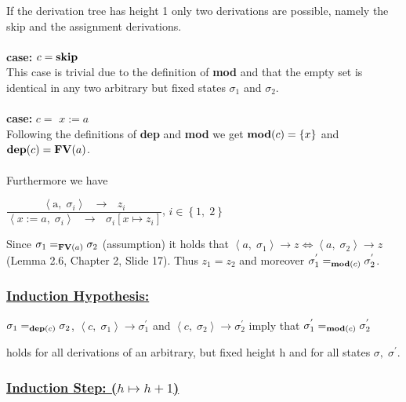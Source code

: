 \documentclass[12pt]{scrartcl}
\newcommand{\eRelation}[2]{$\dfrac{\text{#1}}{\text{#2}}$}
\newcommand{\eState}[2]{$\left\langle \text{#1},\; \text{#2}\right\rangle$}
\newcommand{\eRule}[3]{\eState{#1}{#2} $\rightarrow$ #3}
\newcommand{\Mod}[0]{\text{\textbf{mod}}}
\newcommand{\dep}[0]{\text{\textbf{dep}}}
\newcommand{\FV}[0]{\text{\textbf{FV}}}
\begin{document}
	\indent\indent If the derivation tree has height 1 only two derivations are possible, namely \indent the skip and the assignment derivations.\\\\
	\indent \textbf{case:} $c=\text{\textbf{skip}}$\\
	\indent\indent This case is trivial due to the definition of \textbf{mod} and that the empty set is \indent\indent identical in any two arbitrary but fixed states $\sigma_{1}$ and $\sigma_{2}$.\\\\
	\indent \textbf{case:} $c=$ {\boldmath$x:=a$}\\
	\indent\indent Following the definitions of \textbf{dep} and \textbf{mod} we get $\Mod(c)=\left\lbrace x\right\rbrace$ and \\\indent\indent $\dep(c)=\FV(a)$.\\\\
	\indent\indent Furthermore we have
	\begin{center}
		\eRelation
			{\eRule{a}{$\sigma_{i}$}{$z_{i}$}}
			{\eRule{$x:=a$}{$\sigma_{i}$}{$\sigma_{i}\left[ x\mapsto z_{i}\right]$}}, $i\in \left\lbrace 1,\; 2\right\rbrace$\\
	\end{center}
	\indent\indent\indent Since $\sigma_{1}=_{\FV(a)}\sigma_{2}$ (assumption) it holds that $\left\langle a,\; \sigma_{1}\right\rangle\rightarrow z \Leftrightarrow \left\langle a,\; \sigma_{2}\right\rangle\rightarrow z$ \indent\indent(Lemma 2.6, Chapter 2, Slide 17). Thus $z_{1}=z_{2}$ and moreover $\sigma^{'}_{1}=_{\Mod(c)}\sigma^{'}_{2}$.
	
	\subsubsection*{\underline{Induction Hypothesis:}}
	
	\begin{center}
		$\sigma_{1} =_{\dep(c)} \sigma_{2}$, $\left\langle c,\; \sigma_{1} \right\rangle \rightarrow \sigma^{'}_{1}$ and $\left\langle c, \; \sigma_{2}\right\rangle \rightarrow \sigma^{'}_{2}$ imply that $\sigma^{'}_{1} =_{\Mod(c)}\sigma^{'}_{2}$
	\end{center}
	\indent\indent holds for all derivations of an arbitrary, but fixed height h and for all states \indent$\sigma,\; \sigma^{'}$.
	
\newpage	
	
	\subsubsection*{\underline{Induction Step: ({\boldmath$h\mapsto h+1$})}}
	
\end{document}
